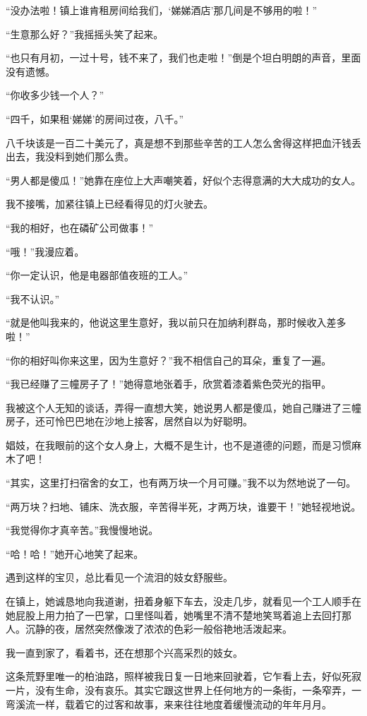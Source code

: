 \par “没办法啦！镇上谁肯租房间给我们，‘娣娣酒店’那几间是不够用的啦！”
\par “生意那么好？”我摇摇头笑了起来。
\par “也只有月初，一过十号，钱不来了，我们也走啦！”倒是个坦白明朗的声音，里面没有遗憾。
\par “你收多少钱一个人？”
\par “四千，如果租‘娣娣’的房间过夜，八千。”
\par 八千块该是一百二十美元了，真是想不到那些辛苦的工人怎么舍得这样把血汗钱丢出去，我没料到她们那么贵。
\par “男人都是傻瓜！”她靠在座位上大声嘲笑着，好似个志得意满的大大成功的女人。
\par 我不接嘴，加紧往镇上已经看得见的灯火驶去。
\par “我的相好，也在磷矿公司做事！”
\par “哦！”我漫应着。
\par “你一定认识，他是电器部值夜班的工人。”
\par “我不认识。”
\par “就是他叫我来的，他说这里生意好，我以前只在加纳利群岛，那时候收入差多啦！”
\par “你的相好叫你来这里，因为生意好？”我不相信自己的耳朵，重复了一遍。
\par “我已经赚了三幢房子了！”她得意地张着手，欣赏着漆着紫色荧光的指甲。
\par 我被这个人无知的谈话，弄得一直想大笑，她说男人都是傻瓜，她自己赚进了三幢房子，还可怜巴巴地在沙地上接客，居然自以为好聪明。
\par 娼妓，在我眼前的这个女人身上，大概不是生计，也不是道德的问题，而是习惯麻木了吧！
\par “其实，这里打扫宿舍的女工，也有两万块一个月可赚。”我不以为然地说了一句。
\par “两万块？扫地、铺床、洗衣服，辛苦得半死，才两万块，谁要干！”她轻视地说。
\par “我觉得你才真辛苦。”我慢慢地说。
\par “哈！哈！”她开心地笑了起来。
\par 遇到这样的宝贝，总比看见一个流泪的妓女舒服些。
\par 在镇上，她诚恳地向我道谢，扭着身躯下车去，没走几步，就看见一个工人顺手在她屁股上用力拍了一巴掌，口里怪叫着，她嘴里不清不楚地笑骂着追上去回打那人。沉静的夜，居然突然像泼了浓浓的色彩一般俗艳地活泼起来。
\par 我一直到家了，看着书，还在想那个兴高采烈的妓女。
\par 这条荒野里唯一的柏油路，照样被我日复一日地来回驶着，它乍看上去，好似死寂一片，没有生命，没有哀乐。其实它跟这世界上任何地方的一条街，一条窄弄，一弯溪流一样，载着它的过客和故事，来来往往地度着缓慢流动的年年月月。

